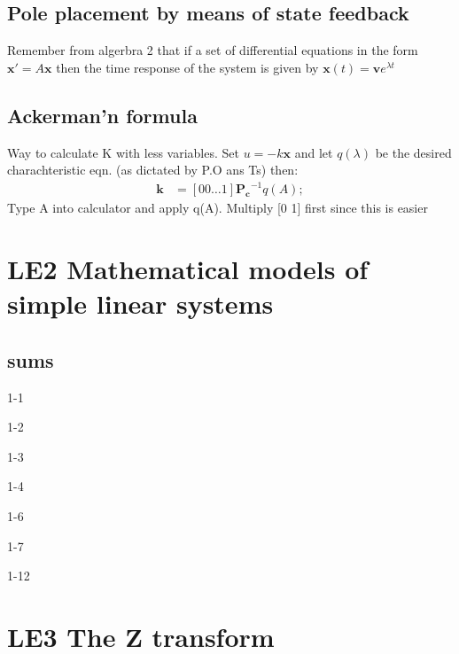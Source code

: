 \documentclass{report}
\begin{document}
	\section{Pole placement by means of state feedback}
\label{sub:pole_placement}
Remember from algerbra 2 that if a set of differential equations in the form $\mathbf{x'} = A\mathbf{x}$ then the time response of the system is given by $\mathbf{x}(t) = \mathbf{v}e^{\lambda t}$
	\section{Ackerman'n formula}

\label{sub:ackerman_s_equation}

Way to calculate K with less variables. Set $u = -k\mathbf{x}$ and let $q(\lambda)$ be the desired charachteristic eqn. (as dictated by P.O ans Ts) then:
\begin{align*}
	\mathbf{k} &= [0 0 \dots 1]\mathbf{P_c}^{-1}q(A);
\end{align*}
Type A into calculator and apply q(A). Multiply [0 1] first since this is easier

\chapter{LE2 Mathematical models of simple linear systems}
	\section{sums}
\begin{itemize}
	\begin{multicols}{3}
	\item 1-1
	\item 1-2
	\item 1-3
	\item 1-4
	\item 1-6
	\item 1-7
	\item 1-12
	\end{multicols}
	
\end{itemize}
\chapter{LE3 The Z transform}
\end{document}
